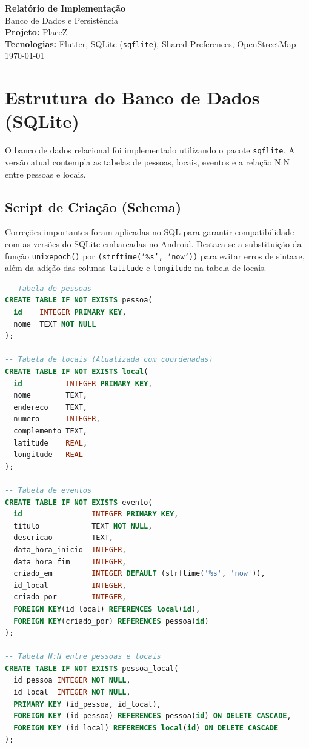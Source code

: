 \documentclass[12pt,a4paper]{article}
\begin{document}
\begin{titlepage}
    \centering
    \vspace*{2cm}
    {\Huge \textbf{Relatório de Implementação}}\\[0.5cm]
    {\Large Banco de Dados e Persistência}\\[2cm]
    
    {\Large \textbf{Projeto:} PlaceZ}\\[0.5cm]
    {\large \textbf{Tecnologias:} Flutter, SQLite (\texttt{sqflite}), Shared Preferences, OpenStreetMap}\\[3cm]
    
    \vfill
    {\large \today}
\end{titlepage}

\newpage
\newpage

\section{Estrutura do Banco de Dados (SQLite)}
O banco de dados relacional foi implementado utilizando o pacote \texttt{sqflite}. A versão atual contempla as tabelas de pessoas, locais, eventos e a relação N:N entre pessoas e locais. 

\subsection{Script de Criação (Schema)}
Correções importantes foram aplicadas no SQL para garantir compatibilidade com as versões do SQLite embarcadas no Android. Destaca-se a substituição da função \texttt{unixepoch()} por \texttt{(strftime(`\%s', `now'))} para evitar erros de sintaxe, além da adição das colunas \texttt{latitude} e \texttt{longitude} na tabela de locais.

\begin{lstlisting}[language=SQL, caption={Script de criação das tabelas.}]
-- Tabela de pessoas
CREATE TABLE IF NOT EXISTS pessoa(
  id    INTEGER PRIMARY KEY,
  nome  TEXT NOT NULL
);

-- Tabela de locais (Atualizada com coordenadas)
CREATE TABLE IF NOT EXISTS local(
  id          INTEGER PRIMARY KEY,
  nome        TEXT,
  endereco    TEXT,
  numero      INTEGER,
  complemento TEXT,
  latitude    REAL,
  longitude   REAL
);

-- Tabela de eventos
CREATE TABLE IF NOT EXISTS evento(
  id                INTEGER PRIMARY KEY,
  titulo            TEXT NOT NULL,
  descricao         TEXT,
  data_hora_inicio  INTEGER,
  data_hora_fim     INTEGER,
  criado_em         INTEGER DEFAULT (strftime('%s', 'now')),
  id_local          INTEGER,
  criado_por        INTEGER,
  FOREIGN KEY(id_local) REFERENCES local(id),
  FOREIGN KEY(criado_por) REFERENCES pessoa(id)
);

-- Tabela N:N entre pessoas e locais
CREATE TABLE IF NOT EXISTS pessoa_local(
  id_pessoa INTEGER NOT NULL,
  id_local  INTEGER NOT NULL,
  PRIMARY KEY (id_pessoa, id_local),
  FOREIGN KEY (id_pessoa) REFERENCES pessoa(id) ON DELETE CASCADE,
  FOREIGN KEY (id_local) REFERENCES local(id) ON DELETE CASCADE
);
\end{lstlisting}
\end{document}

